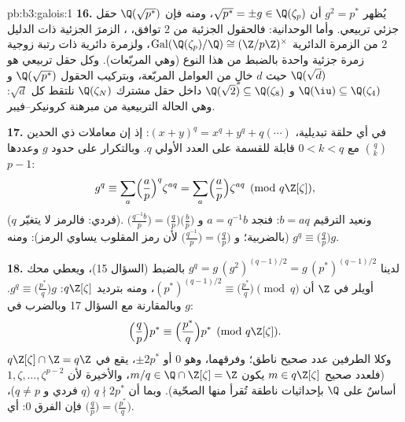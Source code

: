 \begin{solution}{pb:b3:galois:1}
\textbf{16.} يُظهر $g^2 = p^*$ أن $\sqrt{p^*} = \pm g \in
\Q(\zeta_p)$، ومنه فإن
$\Q(\sqrt{p^*})$ حقل جزئي تربيعي. وأما الوحدانية: فالحقول
الجزئية من  $2$ توافق، ، الزمرَ الجزئية ذات
الدليل $2$ من الزمرة الدائرية $\operatorname{Gal}(\Q(\zeta_p)/\Q) \cong (\Z/p\Z)^\times$، ولزمرة دائرية ذات رتبة
زوجية زمرة جزئية واحدة بالضبط من هذا النوع (وهي المربّعات). وكل
حقل تربيعي هو $\Q(\sqrt{d})$ حيث $d$ خالٍ من العوامل المربّعة،
وبتركيب الحقول $\Q(\sqrt{p^*})$ و $\Q(\iu) \subseteq \Q(\zeta_4)$ و $\Q(\sqrt2) \subseteq \Q(\zeta_8)$ داخل حقل
مشترك $\Q(\zeta_N)$ نلتقط كل $\sqrt d$: وهي الحالة التربيعية من
مبرهنة كرونيكر--فيبر.

\textbf{17.} في أي حلقة تبديلية، $(x + y)^q = x^q + y^q
+ q(\cdots)$: إذ إن معاملات ذي
الحدين $\binom qk$ مع $0 < k <
q$ قابلة للقسمة على العدد الأولي $q$.
وبالتكرار على حدود $g$ وعددها $p - 1$:
\[
g^q \equiv \sum_{a}\Bigl(\frac ap\Bigr)^{q}\zeta^{aq}
= \sum_a\Bigl(\frac ap\Bigr)\zeta^{aq}
\pmod{q\Z[\zeta]},
\]
($q$ فردي: فالرمز لا يتغيّر). ونعيد الترقيم $b = aq$: فنجد
$a =
q^{-1}b$ و $\bigl(\frac{q^{-1}b}p\bigr) =
\bigl(\frac{q}p\bigr)\bigl(\frac bp\bigr)$ (بالضربية؛ و $\bigl(\frac{q^{-1}}p\bigr) = \bigl(\frac qp\bigr)$ لأن رمز المقلوب يساوي
الرمز): ومنه $g^q \equiv
\bigl(\frac qp\bigr)g$.

\textbf{18.} لدينا $g^q = g\,(g^2)^{(q-1)/2} = g\,(p^*)^{(q-1)/2}$ بالضبط (السؤال 15)، ويعطي محك
أويلر في $\Z$ أن $(p^*)^{(q-1)/2} \equiv \bigl(\frac{p^*}q\bigr) \pmod q$، ومنه بترديد $q\Z[\zeta]$: $g^q \equiv \bigl(\frac{p^*}q\bigr)g$.
وبالمقارنة مع السؤال 17 وبالضرب في $g$:
\[
\Bigl(\frac qp\Bigr)p^* \equiv \Bigl(\frac{p^*}q\Bigr)p^*
\pmod{q\Z[\zeta]} .
\]
وكلا الطرفين عدد صحيح ناطق؛ وفرقهما، وهو $0$ أو $\pm2p^*$، يقع
في $q\Z[\zeta] \cap \Z = q\Z$ (فلعدد صحيح $m
\in q\Z[\zeta]$ يكون $m/q \in \Q \cap \Z[\zeta] = \Z$، والأخيرة لأن
$1, \zeta, \dots, \zeta^{p-2}$ أساسٌ على $\Q$ بإحداثيات ناطقة تُقرأ منها الصحّية). وبما
أن $q \nmid 2p^*$ ($q$ فردي و $q \neq p$)، فإن الفرق $0$: أي
$\bigl(\frac qp\bigr) =
\bigl(\frac{p^*}q\bigr)$.


\end{solution}
